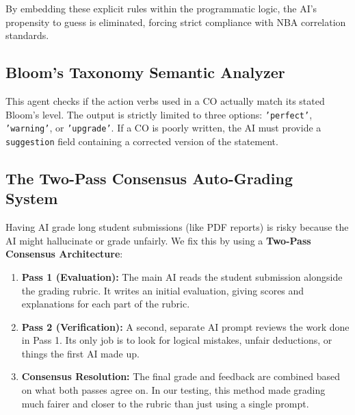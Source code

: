 \documentclass[conference]{IEEEtran}
\begin{document}
By embedding these explicit rules within the programmatic logic, the AI's propensity to guess is eliminated, forcing strict compliance with NBA correlation standards.

\begin{table}[htbp]
\caption{AI-Generated CO-PO Matrix (Exploratory Data Analysis)}
\label{tab:copo_sample}
\centering
{}
\end{table}

\subsection{Bloom's Taxonomy Semantic Analyzer}
This agent checks if the action verbs used in a CO actually match its stated Bloom's level. The output is strictly limited to three options: \texttt{'perfect'}, \texttt{'warning'}, or \texttt{'upgrade'}. If a CO is poorly written, the AI must provide a \texttt{suggestion} field containing a corrected version of the statement.

\subsection{The Two-Pass Consensus Auto-Grading System}
Having AI grade long student submissions (like PDF reports) is risky because the AI might hallucinate or grade unfairly. We fix this by using a \textbf{Two-Pass Consensus Architecture}:
\begin{enumerate}
    \item \textbf{Pass 1 (Evaluation):} The main AI reads the student submission alongside the grading rubric. It writes an initial evaluation, giving scores and explanations for each part of the rubric.
    \item \textbf{Pass 2 (Verification):} A second, separate AI prompt reviews the work done in Pass 1. Its only job is to look for logical mistakes, unfair deductions, or things the first AI made up.
    \item \textbf{Consensus Resolution:} The final grade and feedback are combined based on what both passes agree on. In our testing, this method made grading much fairer and closer to the rubric than just using a single prompt.
\end{enumerate}
\end{document}

